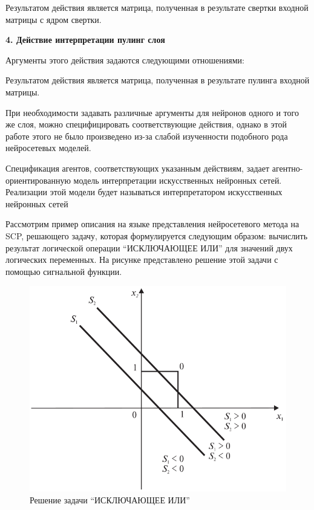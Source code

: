 Результатом действия является матрица, полученная в результате свертки входной матрицы с ядром свертки.


\textbf{4. Действие интерпретации пулинг слоя}

Аргументы этого действия задаются следующими отношениями:
\begin{SCn}



\end{SCn}

Результатом действия является матрица, полученная в результате пулинга входной матрицы.

При необходимости задавать различные аргументы для нейронов одного и того же слоя, можно специфицировать соответствующие действия, однако в этой работе этого не было произведено из-за слабой изученности подобного рода нейросетевых моделей.

Спецификация агентов, соответствующих указанным действиям, задает агентно-ориентированную модель интерпретации искусственных нейронных сетей. Реализации этой модели будет называться интерпретатором искусственных нейронных сетей

Рассмотрим пример описания на языке представления нейросетевого метода на SCP, решающего задачу, которая формулируется следующим образом: вычислить результат логической операции ``ИСКЛЮЧАЮЩЕЕ ИЛИ'' для значений двух логических переменных. На рисунке  представлено решение этой задачи с помощью сигнальной функции.

\begin{figure}
	\centering
	\includegraphics[width=0.5\linewidth]{author/part3/figures/strong_or_graphic.png}
	\caption{Решение задачи ``ИСКЛЮЧАЮЩЕЕ ИЛИ'' }
	\label{fig:strong_or_graphic}
\end{figure}

